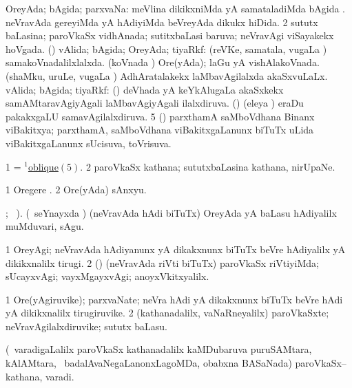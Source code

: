 \bentry
{}
\gl{\gu}
\bmng
% 
\bnum
{} OreyAda; bAgida; parxvaNa: 
\banum
{} meVlina dikikxniMda yA samataladiMda bAgida . 
 neVravAda gereyiMda yA hAdiyiMda beVreyAda dikukx hiDida. 
\eanum
\numie
\num{2} sututx baLasina; paroVkaSx vidhAnada; sutitxbaLasi baruva; neVravAgi viSayakekx hoVgada. 
 (\jAyx) vAlida; bAgida; OreyAda; tiyaRkf: 
\banum
{} (reVKe, samatala, \mo vugaLa \vi) samakoVnadalilxlalxda. 
 (koVnada \vi) Ore(yAda); laGu yA vishAlakoVnada. 
 (shaMku, uruLe, \mo vugaLa \vi) AdhAratalakekx laMbavAgilalxda akaSxvuLaLx. 
\eanum
\numie
{} vAlida; bAgida; tiyaRkf: 
\banum
{} (\aMrashA) deVhada yA keYkAlugaLa akaSxkekx samAMtaravAgiyAgali laMbavAgiyAgali ilalxdiruva. 
 (\savi) (eleya \vi) eraDu pakakxgaLU samavAgilalxdiruva. 
\hypertarget{oblique(1)5}{} 
\eanum
\numie
\num{5} (\vAyx) parxthamA saMboVdhana Binanx viBakitxya; parxthamA, saMboVdhana viBakitxgaLanunx biTuTx uLida viBakitxgaLanunx sUcisuva, toVrisuva. 
\enum
\emng

\noindent
\gl{\pagu}
\bmng
\bnum
\num{1}  = \hyperlink{oblique(1)5}{$^1$oblique\((5)\)}. 
\num{2}  paroVkaSx kathana; sututxbaLasina kathana, nirUpaNe. 
\enum
\emng
\eentry

\bentry
{}
\gl{\nA}
\bmng
% 
\bnum
\num{1} Oregere \eng{$(/)$}. 
\num{2} Ore(yAda) sAnxyu. 
\enum
\emng
\eentry

\bentry
{}
\gl{\akirx}
; \vakaq\ ).\bmng
(\kanmu\ seYnayxda \vi) (neVravAda hAdi biTuTx) OreyAda yA baLasu hAdiyalilx muMduvari, sAgu. 
\emng
\eentry

\bentry
{}
\gl{\kirxvi}
\bmng
\bnum
\num{1} OreyAgi; neVravAda hAdiyanunx yA dikakxnunx biTuTx beVre hAdiyalilx yA dikikxnalilx tirugi. 
\num{2} (\rUpa) (neVravAda riVti biTuTx) paroVkaSx riVtiyiMda; sUcayxvAgi; vayxMgayxvAgi; anoyxVkitxyalilx. 
\enum
\emng
\eentry

\bentry
{}
\gl{\nA}
\bmng
\bnum
\num{1} Ore(yAgiruvike); parxvaNate; neVra hAdi yA dikakxnunx biTuTx beVre hAdi yA dikikxnalilx tirugiruvike. 
\num{2} (kathanadalilx, vaNaRneyalilx) paroVkaSxte; neVravAgilalxdiruvike; sututx baLasu. 
\enum
\emng
\eentry

\bentry
{}
\gl{\nA}
\bmng
(\sA\ varadigaLalilx paroVkaSx kathanadalilx kaMDubaruva puruSAMtara, kAlAMtara, \mo\ badalAvaNegaLanonxLagoMDa, obabxna BASaNada) paroVkaSx--kathana, varadi. 
\emng
\eentry

